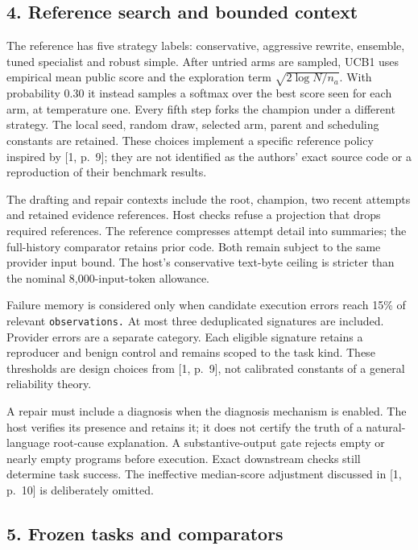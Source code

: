 \documentclass[
  11pt,
]{article}
\begin{document}
\subsection{4. Reference search and bounded
context}\label{reference-search-and-bounded-context}

The reference has five strategy labels: conservative, aggressive
rewrite, ensemble, tuned specialist and robust simple. After untried
arms are sampled, UCB1 uses empirical mean public score and the
exploration term \(\sqrt{2\log N/n_a}\). With probability 0.30 it
instead samples a softmax over the best score seen for each arm, at
temperature one. Every fifth step forks the champion under a different
strategy. The local seed, random draw, selected arm, parent and
scheduling constants are retained. These choices implement a specific
reference policy inspired by {[}1, p.~9{]}; they are not identified as
the authors' exact source code or a reproduction of their benchmark
results.

The drafting and repair contexts include the root, champion, two recent
attempts and retained evidence references. Host checks refuse a
projection that drops required references. The reference compresses
attempt detail into summaries; the full-history comparator retains prior
code. Both remain subject to the same provider input bound. The host's
conservative text-byte ceiling is stricter than the nominal
8,000-input-token allowance.

Failure memory is considered only when candidate execution errors reach
15\% of relevant \nolinkurl{observations.} At most three deduplicated
signatures are included. Provider errors are a separate category. Each
eligible signature retains a reproducer and benign control and remains
scoped to the task kind. These thresholds are design choices from {[}1,
p.~9{]}, not calibrated constants of a general reliability theory.

A repair must include a diagnosis when the diagnosis mechanism is
enabled. The host verifies its presence and retains it; it does not
certify the truth of a natural-language root-cause explanation. A
substantive-output gate rejects empty or nearly empty programs before
execution. Exact downstream checks still determine task success. The
ineffective median-score adjustment discussed in {[}1, p.~10{]} is
deliberately omitted.

\subsection{5. Frozen tasks and
comparators}\label{frozen-tasks-and-comparators}
\end{document}
